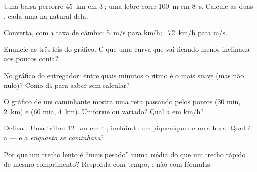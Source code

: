 \begin{exercise}[$\star$]\label{exo:g7:motion-average-speed:2}
Uma balsa percorre \qty{45}{km} em $3$ ; uma lebre corre
\qty{100}{m} em \qty{8}{s}. Calcule as duas , cada uma na
 natural dela.
\end{exercise}

\begin{exercise}[$\star$]\label{exo:g7:motion-average-speed:3}
Converta, com a taxa de câmbio: \qty{5}{m/s} para \unit{km/h}; \
\qty{72}{km/h} para \unit{m/s}.
\end{exercise}

\begin{exercise}[$\star$]\label{exo:g7:motion-average-speed:4}
Enuncie as três leis do gráfico. O que uma curva que vai ficando
menos inclinada aos poucos conta?
\end{exercise}

\begin{exercise}[$\star$]\label{exo:g7:motion-average-speed:5}
No gráfico do entregador: entre quais minutos o ritmo é o mais suave
(mas não nulo)? Como dá para saber sem calcular?
\end{exercise}

\begin{exercise}[$\star$]\label{exo:g7:motion-average-speed:6}
O gráfico de um caminhante mostra uma reta passando pelos pontos
($30$ min, \qty{2}{km}) e ($60$ min, \qty{4}{km}). Uniforme ou
variado? Qual a  em \unit{km/h}?
\end{exercise}

\begin{exercise}[$\star$]\label{exo:g7:motion-average-speed:7}
Defina . Uma trilha: \qty{12}{km} em $4$ ,
incluindo um piquenique de uma hora. Qual é a  --- e
a \omterm{def:g7:motion-average-speed:average}{velocidade média} \emph{enquanto se caminhava}?
\end{exercise}

\begin{exercise}[$\star\star$]\label{exo:g7:motion-average-speed:8}
Por que um trecho lento é ``mais pesado'' numa média do que um trecho
rápido de mesmo comprimento? Responda com tempo, e não com fórmulas.
\end{exercise}


